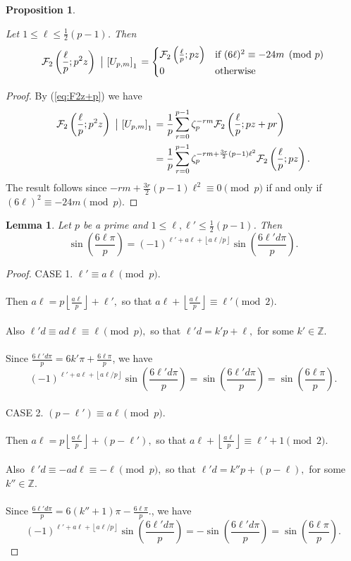 \documentclass[12pt]{amsart}
\newtheorem{lemma}[theorem]{Lemma}
\newtheorem{prop}[theorem]{Proposition}
\theoremstyle{definition}
\theoremstyle{remark}
\numberwithin{equation}{section}
\newcommand{\Parans}[1]{\left(#1\right)}
\newcommand\Fell[4]{\mathcal{F}_{#1}\left(\frac{#2}{#3};#4\right)}
\newcommand\FL[1]{\left\lfloor#1\right\rfloor}
\newcommand\strokeb[2]{\,\left\arrowvert\,\left[#1\right]_#2\right.}
\newcommand\eqn[1]{(\ref{eq:#1})}
\begin{document}
\begin{prop}\label{propo:F2transU}

Let $1 \le \ell \le \tfrac{1}{2}(p-1)$. Then
$$
\Fell{2}{\ell}{p}{p^2z}
  \strokeb{U_{p,m}}{1} 
=
\begin{cases}
\Fell{2}{\ell}{p}{pz} & \mbox{if $(6\ell)^2 \equiv -24m \pmod{p}$}\\
0 & \mbox{otherwise}
\end{cases}
$$

\end{prop}

\begin{proof}
By \eqn{F2z+p} we have
\begin{align*}
\Fell{2}{\ell}{p}{p^2z} \strokeb{U_{p,m}}{1} & = \frac{1}{p} \sum_{r=0}^{p-1} \zeta_p^{-rm} \Fell{2}{\ell}{p}{pz + pr} 
\\
& = \frac{1}{p} \sum_{r=0}^{p-1} \zeta_p^{-rm + \frac{3r}{2}(p-1)\ell^2} \Fell{2}{\ell}{p}{pz}.
\end{align*}
The result follows since
${-rm + \frac{3r}{2}(p-1)\ell^2}  \equiv 0 \pmod{p}$ if and only if
$(6\ell)^2 \equiv -24m \pmod{p}.$
\end{proof}

\begin{lemma}\label{lem:sineq}
Let $p$ be a prime and $1 \le \ell,\ell' \le \tfrac{1}{2}(p-1)$. Then
$$
\sin\Parans{\frac{6\ell\pi}{p}}
=
(-1)^{\ell'  + a\ell + \FL{a\ell/p}} \sin\Parans{\frac{6\ell'd\pi}{p}}.
$$

\end{lemma}

\begin{proof}
CASE 1. $\ell' \equiv a\ell \pmod{p}$. 
\\\\
Then $a \ell =  p \FL{\frac{a\ell}{p}}+ \ell',$ so that 
$a \ell + \FL{\frac{a\ell}{p}} \equiv  \ell' \pmod{2}.$
\\\\
Also $\ell ' d \equiv ad \ell \equiv \ell \pmod{p},$ so that $\ell ' d  = k' p + \ell,$ for some $k'\in \mathbb{Z}$. 
\\\\
Since $\frac{6\ell ' d \pi}{p}  = 6k'\pi + \frac{6\ell\pi}{p}$, we have
$$
(-1)^{\ell'  + a\ell + \FL{a\ell/p}} \sin\Parans{\frac{6\ell'd\pi}{p}}
=
\sin\Parans{\frac{6\ell'd\pi}{p}}
=
\sin\Parans{\frac{6\ell\pi}{p}}.
$$
\\
CASE 2. $(p -\ell') \equiv a\ell \pmod{p}$. 
\\\\
Then
$a \ell =  p \FL{\frac{a\ell}{p}} + (p  - \ell'),$ so that $a \ell + \FL{\frac{a\ell}{p}} \equiv  \ell' + 1\pmod{2}.$
\\\\
Also $\ell ' d \equiv -ad \ell \equiv -\ell \pmod{p},$ so that $\ell ' d  = k'' p + (p- \ell),$ for some $k''\in \mathbb{Z}$. 
\\\\
Since $\frac{6\ell ' d \pi}{p}  = 6(k''+1)\pi - \frac{6\ell\pi}{p}.$, we have
$$
(-1)^{\ell'  + a\ell + \FL{a\ell/p}} \sin\Parans{\frac{6\ell'd\pi}{p}}
=
-\sin\Parans{\frac{6\ell'd\pi}{p}}
=
\sin\Parans{\frac{6\ell\pi}{p}}.
$$


\end{proof}
\end{document}
